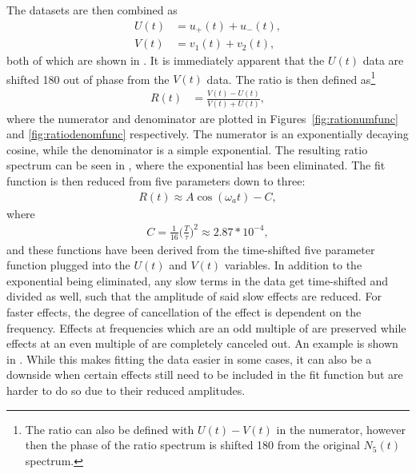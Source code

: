 The datasets are then combined as 
    \begin{equation}
    \begin{aligned}
        U(t) &= u_{+}(t) + u_{-}(t), \\
        V(t) &= v_{1}(t) + v_{2}(t),
    \label{eq:UandV}
    \end{aligned}
    \end{equation}
both of which are shown in . It is immediately apparent that the $U(t)$ data are shifted 180\textdegree{} out of phase from the $V(t)$ data. The ratio is then defined as\footnote{The ratio can also be defined with $U(t) - V(t)$ in the numerator, however then the phase of the ratio spectrum is shifted 180\textdegree{} from the original $N_{5}(t)$ spectrum.}
    \begin{align}
        R(t) &= \frac{V(t) - U(t)}{V(t) + U(t)},
    \label{eq:ratioUV}
    \end{align}
where the numerator and denominator are plotted in Figures~\ref{fig:rationumfunc} and \ref{fig:ratiodenomfunc} respectively. The numerator is an exponentially decaying cosine, while the denominator is a simple exponential. The resulting ratio spectrum can be seen in , where the exponential has been eliminated. The fit function is then reduced from five parameters down to three:
    \begin{align}
        R(t) \approx A \cos(\omega_{a}t) - C,
    \label{eq:ratiowithC}
    \end{align}
where  
    \begin{align}
        C = \frac{1}{16} \Big(\frac{T}{\tau}\Big)^{2} \approx 2.87 * 10^{-4},
    \end{align}
and these functions have been derived from the time-shifted five parameter function plugged into the $U(t)$ and $V(t)$ variables. In addition to the exponential being eliminated, any slow terms in the data get time-shifted and divided as well, such that the amplitude of said slow effects are reduced. For faster effects, the degree of cancellation of the effect is dependent on the frequency. Effects at frequencies which are an odd multiple of \wa are preserved while effects at an even multiple of \wa are completely canceled out. An example is shown in . While this makes fitting the data easier in some cases, it can also be a downside when certain effects still need to be included in the fit function but are harder to do so due to their reduced amplitudes.


